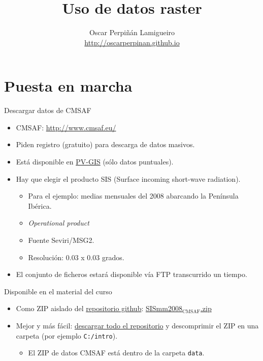 \documentclass[xcolor={usenames,svgnames,dvipsnames}]{beamer}
\author{Oscar Perpiñán Lamigueiro \\ \url{http://oscarperpinan.github.io}}
\date{}
\title{Uso de datos raster}
\begin{document}
\maketitle


\section{Puesta en marcha}
\label{sec-1}

\begin{frame}[label=sec-1-1]{Descargar datos de CMSAF}
\begin{itemize}
\item CMSAF: \url{http://www.cmsaf.eu/}
\item Piden registro (gratuito) para descarga de datos masivos.
\item Está disponible en \href{http://re.jrc.ec.europa.eu/pvgis/apps4/pvest.php}{PV-GIS} (sólo datos puntuales).
\item Hay que elegir el producto SIS (Surface incoming short-wave radiation).
\begin{itemize}
\item Para el ejemplo: medias mensuales del 2008 abarcando la Península Ibérica.
\item \emph{Operational product}
\item Fuente Seviri/MSG2.
\item Resolución: 0.03 x 0.03 grados.
\end{itemize}
\item El conjunto de ficheros estará disponible vía FTP transcurrido un tiempo.
\end{itemize}
\end{frame}

\begin{frame}[fragile,label=sec-1-2]{Disponible en el material del curso}
 \begin{itemize}
\item Como ZIP aislado del \href{https://github.com/oscarperpinan/intro}{repositorio github}: \href{https://github.com/oscarperpinan/intro/blob/master/data/SISmm2008_CMSAF.zip}{SISmm2008$_{\text{CMSAF}}$.zip}
\item Mejor y más fácil: \href{https://github.com/oscarperpinan/intro/archive/master.zip}{descargar todo el repositorio} y descomprimir el ZIP en una carpeta (por ejemplo \texttt{C:/intro}).
\begin{itemize}
\item El ZIP de datos CMSAF está dentro de la carpeta \texttt{data}.
\end{itemize}
\end{itemize}
\end{frame}
\end{document}
